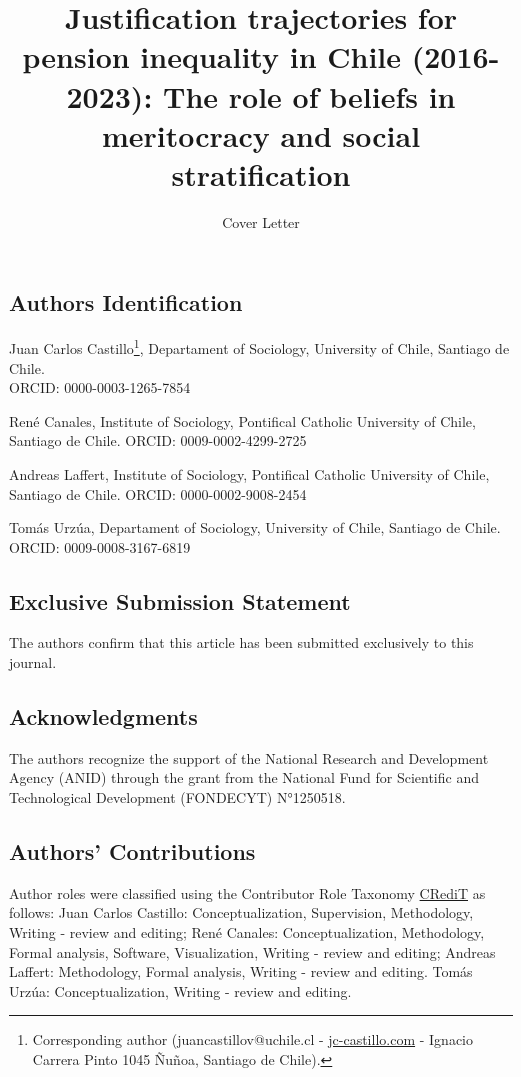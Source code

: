 \documentclass[
  12pt,
  letterpaper,
  DIV=11,
  numbers=noendperiod]{scrartcl}
\title{Justification trajectories for pension inequality in Chile
(2016-2023): The role of beliefs in meritocracy and social
stratification}
\subtitle{Cover Letter}
\author{}
\date{}
\begin{document}
\maketitle


\subsection{Authors Identification}\label{authors-identification}

Juan Carlos Castillo\footnote{Corresponding author
  (juancastillov@uchile.cl -
  \href{https://juancarloscastillo.github.io/jc-castillo/}{jc-castillo.com}
  - Ignacio Carrera Pinto 1045 Ñuñoa, Santiago de Chile).}, Departament
of Sociology, University of Chile, Santiago de Chile.\\
ORCID: 0000-0003-1265-7854

René Canales, Institute of Sociology, Pontifical Catholic University of
Chile, Santiago de Chile. ORCID: 0009-0002-4299-2725

Andreas Laffert, Institute of Sociology, Pontifical Catholic University
of Chile, Santiago de Chile. ORCID: 0000-0002-9008-2454

Tomás Urzúa, Departament of Sociology, University of Chile, Santiago de
Chile. ORCID: 0009-0008-3167-6819

\subsection{Exclusive Submission
Statement}\label{exclusive-submission-statement}

The authors confirm that this article has been submitted exclusively to
this journal.

\subsection{Acknowledgments}\label{acknowledgments}

The authors recognize the support of the National Research and
Development Agency (ANID) through the grant from the National Fund for
Scientific and Technological Development (FONDECYT) N°1250518.

\subsection{Authors' Contributions}\label{authors-contributions}

Author roles were classified using the Contributor Role Taxonomy
\href{https://credit.niso.org/}{CRediT} as follows: Juan Carlos
Castillo: Conceptualization, Supervision, Methodology, Writing - review
and editing; René Canales: Conceptualization, Methodology, Formal
analysis, Software, Visualization, Writing - review and editing; Andreas
Laffert: Methodology, Formal analysis, Writing - review and editing.
Tomás Urzúa: Conceptualization, Writing - review and editing.
\end{document}
